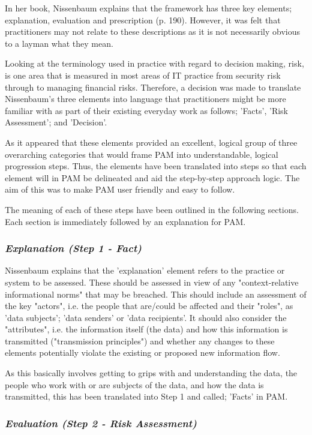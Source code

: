 In her book, Nissenbaum explains that the framework has three key elements; explanation, evaluation and prescription (p. 190). However, it was felt that practitioners may not relate to these descriptions as it is not necessarily obvious to a layman what they mean. 

Looking at the terminology used in practice with regard to decision making, risk, is one area that is measured in most areas of IT practice from security risk through to managing financial risks. Therefore, a decision was made to translate Nissenbaum's three elements into language that practitioners might be more familiar with as part of their existing everyday work as follows; 'Facts', 'Risk Assessment'; and 'Decision'.  

As it appeared that these elements provided an excellent, logical group of three overarching categories that would frame PAM into understandable, logical progression steps. Thus, the elements have been translated into steps so that each element will in PAM be delineated and aid the step-by-step approach logic. The aim of this was to make PAM user friendly and easy to follow. 

The meaning of each of these steps have been outlined in the following sections. Each section is immediately followed by an explanation for PAM.

\subsubsection {{\it Explanation (Step 1 - Fact)}}

Nissenbaum explains that the 'explanation' element refers to the practice or system to be assessed. These should be assessed in view of any "context-relative informational norms" that may be breached. This should include an assessment of the key "actors", i.e. the people that are/could be affected and their "roles", as 'data subjects'; 'data senders' or 'data recipients'. It should also consider the "attributes", i.e. the information itself (the data) and how this information is transmitted ("transmission principles") and whether any changes to these elements potentially violate the existing or proposed new information flow. 

As this basically involves getting to grips with and understanding the data, the people who work with or are subjects of the data, and how the data is transmitted, this has been translated into Step 1 and called; 'Facts' in PAM.  

\subsubsection {{\it Evaluation (Step 2 - Risk Assessment)}}

